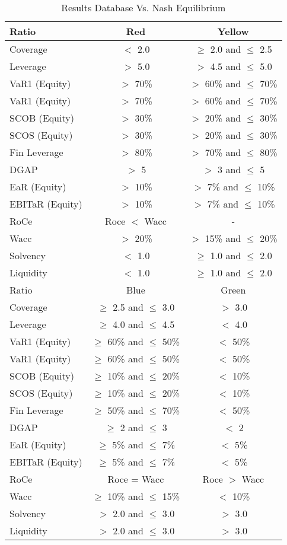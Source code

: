 \documentclass[12pt]{book}
\begin{document}
\begin{table}[htbp]
\begin{center}
\begin{tabular}{| l | c | c |}
\hline
Ratio & Red & Yellow \\
\hline \hline
Coverage  & $<$ 2.0 & $\geq$ 2.0 and $\leq$ 2.5  \\ \hline
Leverage  & $>$ 5.0 & $>$ 4.5 and $\leq$ 5.0  \\ \hline
VaR1 (Equity)  & $>$ 70\% & $>$ 60\% and $\leq$ 70\% \\ \hline
VaR1 (Equity)  & $>$ 70\% & $>$ 60\% and $\leq$ 70\% \\ \hline
SCOB (Equity)  & $>$ 30\% & $>$ 20\% and $\leq$ 30\% \\ \hline
SCOS (Equity)  & $>$ 30\% & $>$ 20\% and $\leq$ 30\%  \\ \hline
Fin Leverage  & $>$ 80\% & $>$ 70\% and $\leq$ 80\%  \\ \hline
DGAP & $>$ 5 & $>$ 3 and $\leq$ 5 \\ \hline
EaR (Equity) & $>$ 10\% & $>$ 7\% and $\leq$ 10\%  \\ \hline
EBITaR (Equity) & $>$ 10\% & $>$ 7\% and $\leq$ 10\% \\ \hline
RoCe & Roce $<$ Wacc & - \\ \hline
Wacc &  $>$ 20\% & $>$ 15\% and $\leq$ 20\% \\ \hline
Solvency &  $<$ 1.0 & $\geq$ 1.0 and $\leq$ 2.0 \\ \hline
Liquidity &  $<$ 1.0 & $\geq$ 1.0 and $\leq$ 2.0 \\ \hline
\hline \hline
Ratio & Blue & Green \\
\hline \hline
Coverage & $\geq$ 2.5 and $\leq$ 3.0 & $>$ 3.0 \\ \hline
Leverage  & $\geq$ 4.0 and $\leq$ 4.5 & $<$ 4.0 \\ \hline
VaR1 (Equity) & $\geq$ 60\% and $\leq$ 50\% & $<$ 50\% \\ \hline
VaR1 (Equity) & $\geq$ 60\% and $\leq$ 50\% & $<$ 50\% \\ \hline
SCOB (Equity) & $\geq$ 10\% and $\leq$ 20\% & $<$ 10\% \\ \hline
SCOS (Equity) & $\geq$ 10\% and $\leq$ 20\% & $<$ 10\% \\ \hline
Fin Leverage & $\geq$ 50\% and $\leq$ 70\% & $<$ 50\% \\ \hline
DGAP & $\geq$ 2 and $\leq$ 3 & $<$ 2 \\ \hline
EaR (Equity) & $\geq$ 5\% and $\leq$ 7\% & $<$ 5\% \\ \hline
EBITaR (Equity) & $\geq$ 5\% and $\leq$ 7\% & $<$ 5\% \\ \hline
RoCe & Roce = Wacc & Roce $>$ Wacc \\ \hline
Wacc & $\geq$ 10\% and $\leq$ 15\% & $<$ 10\% \\ \hline
Solvency & $>$ 2.0 and $\leq$ 3.0 & $>$ 3.0\\ \hline
Liquidity & $>$ 2.0 and $\leq$ 3.0 & $>$ 3.0\\ \hline
\end{tabular}
\caption{Results Database Vs. Nash Equilibrium }
\label{table 2}
\end{center}
\end{table}
\end{document}
